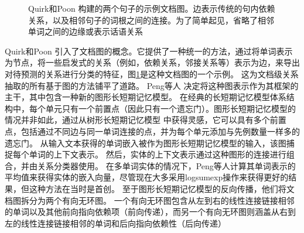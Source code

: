 \documentclass[bachelor]{thesis-uestc}
\begin{document}
\begin{figure}[t!]
\begin{dependency}[theme = simple]
    \end{dependency}
    \vspace{-4em}
    \caption{Quirk和Poon \cite{quirk-poon-2017-distant}构建的两个句子的示例文档图。边表示传统的句内依赖关系，以及相邻句子的词根之间的连接。为了简单起见，省略了相邻单词之间的边缘或表示话语关系}
    \label{fig:quirk-poon}
\end{figure}
Quirk和Poon \cite{quirk-poon-2017-distant} 引入了文档图的概念。它提供了一种统一的方法，通过将单词表示为节点，将一些启发式的关系（例如，依赖关系，邻接关系等）表示为边，来导出对待预测的关系进行分类的特征，图\ref{fig:quirk-poon}是这种文档图的一个示例。
这为文档级关系抽取的所有基于图的方法铺平了道路。
Peng等人 \cite{peng-etal-2017-cross} 决定将这种图表示作为其框架的主干，其中包含一种新的图形长短期记忆模型。
在经典的长短期记忆模型体系结构中，每个单元只有一个前置点（因此只有一个遗忘门）。图形长短期记忆模型的情况并非如此，通过从树形长短期记忆模型 \cite{tai-etal-2015-improved} 中获得灵感，它可以具有多个前置点，包括通过不同边与同一单词连接的点，并为每个单元添加与先例数量一样多的遗忘门。
从输入文本获得的单词嵌入被作为图形长短期记忆模型的输入，该图捕捉每个单词的上下文表示。
然后，实体的上下文表示通过这种图形的连接进行组合，并由关系分类器使用。
在多单词实体的情况下，Peng等人计算其单词表示的平均值来获得实体的嵌入向量，尽管现在大多采用logsumexp操作来获得更好的结果，但这种方法在当时是首创。
至于图形长短期记忆模型的反向传播，他们将文档图拆分为两个有向无环图。
一个有向无环图包含从左到右的线性连接链接相邻的单词以及其他前向指向依赖项（前向传递），而另一个有向无环图则涵盖从右到左的线性连接链接相邻的单词和后向指向依赖性（后向传递） \par
\end{document}
